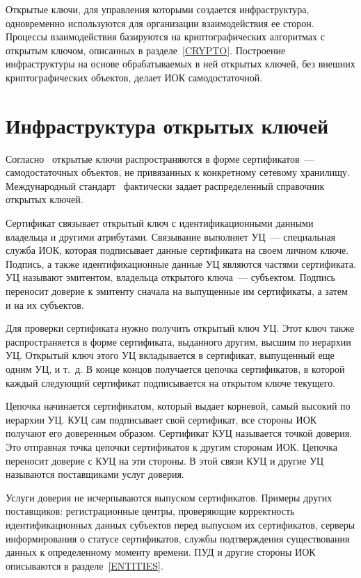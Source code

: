 Открытые ключи, для управления которыми создается инфраструктура,
одновременно используются для организации взаимодействия ее сторон.
%
Процессы взаимодействия базируются на криптографических алгоритмах 
с открытым ключом, описанных в разделе~\ref{CRYPTO}.
%
Построение инфраструктуры на основе обрабатываемых в ней открытых ключей,
без внешних криптографических объектов, делает ИОК самодостаточной.

\section{Инфраструктура открытых ключей}

Согласно~\cite{X509} открытые ключи распространяются в форме сертификатов~--- 
самодостаточных объектов, не привязанных к конкретному сетевому хранилищу. 
Международный стандарт~\cite{X509} фактически задает распределенный справочник 
открытых ключей.

Сертификат связывает открытый ключ с идентификационными данными владельца
и другими атрибутами. Связывание выполняет УЦ~--- специальная служба 
ИОК, которая  подписывает данные сертификата на своем личном ключе. Подпись,
а также идентификационные данные УЦ являются частями сертификата.
УЦ называют эмитентом, владельца открытого ключа~--- субъектом. Подпись 
переносит доверие к эмитенту сначала на выпущенные им сертификаты, а затем 
и на их субъектов. 

Для проверки сертификата нужно получить открытый ключ УЦ. 
Этот ключ также распространяется в форме сертификата, выданного другим, 
высшим по иерархии УЦ. Открытый ключ этого УЦ вкладывается в сертификат,
выпущенный еще одним УЦ, и т.~д. В конце концов получается цепочка сертификатов,
в которой каждый следующий сертификат подписывается на открытом ключе текущего.

Цепочка начинается сертификатом, который выдает корневой, самый высокий 
по иерархии УЦ. КУЦ сам подписывает свой сертификат, все стороны ИОК
получают его доверенным образом. Сертификат КУЦ называется точкой доверия. 
Это отправная точка цепочки сертификатов к другим сторонам ИОК. 
Цепочка переносит доверие с КУЦ на эти стороны. В этой связи КУЦ и 
другие УЦ называются поставщиками услуг доверия.

Услуги доверия не исчерпываются выпуском сертификатов.
Примеры других поставщиков: регистрационные центры, 
проверяющие корректность идентификационных данных субъектов 
перед выпуском их сертификатов, серверы информирования о статусе сертификатов,  
службы подтверждения существования данных к определенному моменту времени. 
%
ПУД и другие стороны ИОК описываются в разделе~\ref{ENTITIES}.

